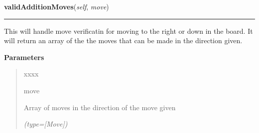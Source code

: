    \vspace{0.5ex}

\hspace{.8\funcindent}\begin{boxedminipage}{\funcwidth}

    \raggedright \textbf{validAdditionMoves}(\textit{self}, \textit{move})

    \vspace{-1.5ex}

    \rule{\textwidth}{0.5\fboxrule}
\setlength{\parskip}{2ex}
    This will handle move verificatin for moving to the right or down in 
    the board. It will return an array of the the moves that can be made in
    the direction given.

\setlength{\parskip}{1ex}
      \textbf{Parameters}
      \vspace{-1ex}

      \begin{quote}
        \begin{Ventry}{xxxx}

          \item[move]

          Array of moves in the direction of the move given

            {\it (type=[Move])}

        \end{Ventry}

      \end{quote}

    \end{boxedminipage}

    \label{UnBlockMeSolver:Map:Map:Map:validSubtractionMoves}

    \vspace{0.5ex}

